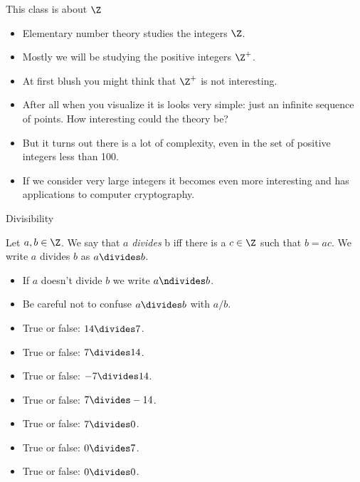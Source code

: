 \documentclass{beamer}
\begin{document}
\begin{frame}{This class is about $\Z$}

\begin{itemize}
\item Elementary number theory studies the integers $\Z$.
\item Mostly we will be studying the positive integers $\Z^+$.
\item At first blush you might think that $\Z^+$ is not interesting.
\item After all when you visualize it is looks very simple: just an infinite sequence of points.
How interesting could the theory be?
\item But it turns out there is a lot of complexity, even in the set of positive integers less than 100.
\item If we consider very large integers it becomes even more interesting and has applications
to computer cryptography.
\end{itemize}
\end{frame}

\begin{frame}{Divisibility}

\begin{definition}
Let $a,b\in\Z$. We say that $a$ \emph{divides} b iff there is a $c\in\Z$ such that $b = a c$.
We write $a$ divides $b$ as $a\divides b$.
\end{definition}

\begin{itemize}
  \item If $a$ doesn't divide $b$ we write $a\ndivides b$.
  \item Be careful not to confuse $a\divides b$ with $a/b$.
  \item True or false: $14 \divides 7$.
  \item True or false: $7 \divides 14$.
  \item True or false: $-7 \divides 14$.
  \item True or false: $7 \divides -14$.
  \item True or false: $7 \divides 0$.
  \item True or false: $0 \divides 7$.
  \item True or false: $0 \divides 0$.
\end{itemize}

\end{frame}
\end{document}
